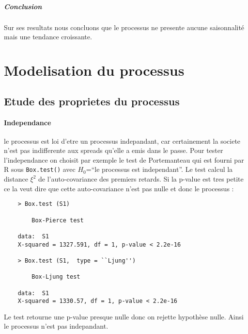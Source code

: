    \subparagraph{Conclusion}
    Sur ses resultats nous concluons que le processus ne presente aucune
    saisonnalité mais une tendance croissante.
\section{Modelisation du processus}
    \subsection{Etude des proprietes du processus}    
    \paragraph{Independance} 

    le processus est loi d'etre un processus indepandant, car certainement la
    societe n'est pas indifferente aux spreads qu'elle a emis dans le passe.
    Pour tester l'independance on choisit par exemple le test de Portemanteau
    qui est fourni par R sous \verb+Box.test()+ avec $H_0$=``le processus est
    independant''. Le test calcul
    la distance $\xi^2$ de l'auto-covariance des premiers retards. Si la p-value est tres petite ce la
    veut dire que cette auto-covariance n'est pas nulle et donc le processus :
    \begin{verbatim}
    > Box.test (S1)

        Box-Pierce test

    data:  S1
    X-squared = 1327.591, df = 1, p-value < 2.2e-16

    > Box.test (S1,  type = ``Ljung'')

        Box-Ljung test

    data:  S1
    X-squared = 1330.57, df = 1, p-value < 2.2e-16

    \end{verbatim}

    Le test retourne une p-value presque nulle donc on rejette hypothèse nulle.
    Ainsi le processus n'est pas indepandant.

